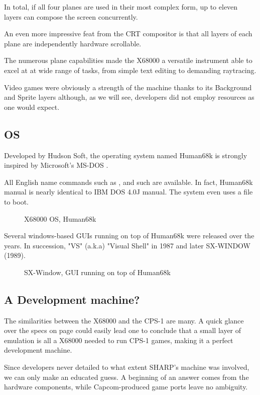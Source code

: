 In total, if all four planes are used in their most complex form, up to eleven layers can compose the screen concurrently. 

An even more impressive feat from the CRT compositor is that all layers of each plane are independently hardware scrollable.

The numerous plane capabilities made the X68000 a versatile instrument able to excel at at wide range of tasks, from simple text editing to demanding raytracing. 

Video games were obviously a strength of the machine thanks to its Background and Sprite layers although, as we will see, developers did not employ resources as one would expect.



\subsection{OS}
Developed by Hudson Soft, the operating system named Human68k is strongly inspired by Microsoft's MS-DOS . 

All English name commands such as ,  and such are available. In fact, Human68k manual is nearly identical to IBM DOS 4.0J manual\cite{human68k_manual}. The system even uses a  file to boot.

\begin{figure}[H]
\caption*{X68000 OS, Human68k}
\end{figure}


Several windows-based GUIs running on top of Human68k were released over the years. In succession, "VS" (a.k.a) "Visual Shell" in 1987 and later SX-WINDOW (1989).

\begin{figure}[H]
\caption*{SX-Window, GUI running on top of Human68k}
\end{figure}



\subsection{A Development machine?}
The similarities between the X68000 and the CPS-1 are many. A quick glance over the specs on page \pageref{x68000-specs} could easily lead one to conclude that a small layer of emulation is all a X68000 needed to run CPS-1 games, making it a perfect development machine. 

Since developers never detailed to what extent SHARP's machine was involved, we can only make an educated guess. A beginning of an answer comes from the hardware components, while Capcom-produced game ports leave no ambiguity.


